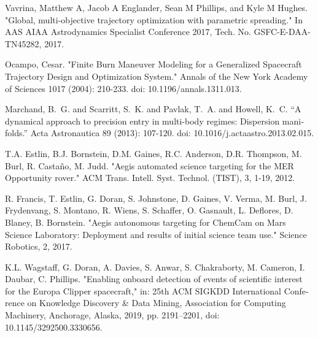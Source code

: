 \documentclass[a4paper]{article}
\begin{document}
\noindent
\newpage

%

%	

\begin{latin}
	\begin{thebibliography}{1}
		
		
		Vavrina, Matthew A, Jacob A Englander, Sean M Phillips, and Kyle M Hughes.
		"Global, multi-objective trajectory optimization with parametric spreading."
		In AAS AIAA Astrodynamics Specialist Conference 2017, Tech. No. GSFC-E-DAA-TN45282, 2017.	
		
		
		Ocampo, Cesar.
		"Finite Burn Maneuver Modeling for a Generalized Spacecraft Trajectory Design and Optimization System."
		Annals of the New York Academy of Sciences 1017 (2004): 210-233.
		doi: 10.1196/annals.1311.013.
		
		
		
		
		Marchand, B.~G. and Scarritt, S.~K. and Pavlak, T.~A. and Howell, K.~C.
		``A dynamical approach to precision entry in multi-body regimes: Dispersion manifolds.''
		Acta Astronautica 89 (2013): 107-120.
		doi: 10.1016/j.actaastro.2013.02.015.
		
		T.A. Estlin, B.J. Bornstein, D.M. Gaines, R.C. Anderson, D.R. Thompson, M. Burl, R. Castaño, M. Judd.
		"Aegis automated science targeting for the MER Opportunity rover."
		ACM Trans. Intell. Syst. Technol. (TIST), 3, 1-19, 2012.
		
		R. Francis, T. Estlin, G. Doran, S. Johnstone, D. Gaines, V. Verma, M. Burl, J. Frydenvang, S. Montano, R. Wiens, S. Schaffer, O. Gasnault, L. Deflores, D. Blaney, B. Bornstein.
		"Aegis autonomous targeting for ChemCam on Mars Science Laboratory: Deployment and results of initial science team use."
		Science Robotics, 2, 2017.
		
		K.L. Wagstaff, G. Doran, A. Davies, S. Anwar, S. Chakraborty, M. Cameron, I. Daubar, C. Phillips.
		"Enabling onboard detection of events of scientific interest for the Europa Clipper spacecraft,"
		in: 25th ACM SIGKDD International Conference on Knowledge Discovery \& Data Mining,
		Association for Computing Machinery, Anchorage, Alaska, 2019, pp. 2191--2201,
		doi: 10.1145/3292500.3330656.
		

\end{thebibliography}
\end{latin}
\end{document}
